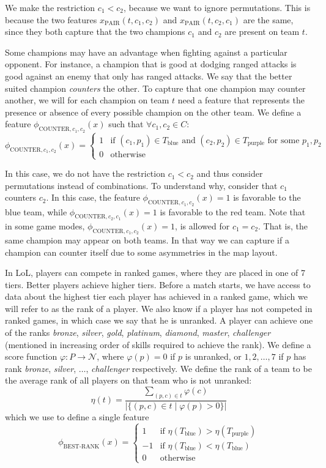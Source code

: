 We make the restriction $c_1 < c_2$, because we want to ignore permutations. This is because the two features $x_\text{PAIR}(t, c_1, c_2)$ and $x_\text{PAIR}(t, c_2, c_1)$ are the same, since they both capture that the two champions $c_1$ and $c_2$ are present on team $t$.

Some champions may have an advantage when fighting against a particular opponent.
For instance, a champion that is good at dodging ranged attacks is good against an enemy that only has ranged attacks.
We say that the better suited champion \emph{counters} the other.
To capture that one champion may counter another, we will for each champion on team $t$ need a feature that represents the presence or absence of every possible champion on the other team.
We define a feature $\phi_{\text{COUNTER},c_1,c_2}(x)$ such that $\forall c_1, c_2 \in C:$
\[\phi_{\text{COUNTER},c_1,c_2}(x) = 
\begin{cases} 
1 & \text{if } (c_1, p_1) \in T_\text{blue} \text{ and } (c_2, p_2) \in T_\text{purple} \text{ for some } p_1, p_2 \\ 
0 & \text{otherwise} 
\end{cases}\]

In this case, we do not have the restriction $c_1 < c_2$ and thus consider permutations instead of combinations.
To understand why, consider that $c_1$ counters $c_2$.
In this case, the feature $\phi_{\text{COUNTER},c_1,c_2}(x) = 1$ is favorable to the blue team, while $\phi_{\text{COUNTER},c_2,c_1}(x) = 1$ is favorable to the red team.
Note that in some game modes, $\phi_{\text{COUNTER},c_1,c_2}(x) = 1$, is allowed for $c_1 = c_2$. That is, the same champion may appear on both teams.
In that way we can capture if a champion can counter itself due to some asymmetries in the map layout.

In LoL, players can compete in ranked games, where they are placed in one of 7 tiers. Better players achieve higher tiers.
Before a match starts, we have access to data about the highest tier each player has achieved in a ranked game, which we will refer to as the rank of a player. We also know if a player has not competed in ranked games, in which case we say that he is unranked.
A player can achieve one of the ranks \textit{bronze}, \textit{silver}, \textit{gold}, \textit{platinum}, \textit{diamond}, \textit{master}, \textit{challenger} (mentioned in increasing order of skills required to achieve the rank).
We define a score function $\varphi : P \rightarrow \mathcal{N}$, where $\varphi(p) = 0$ if $p$ is unranked, or $1, 2, \dots, 7$ if $p$ has rank \textit{bronze}, \textit{silver}, $\dots$, \textit{challenger} respectively.
We define the rank of a team to be the average rank of all players on that team who is not unranked:
\[
\eta(t) = \frac{\sum\limits_{(p, c) \in t} \varphi(c)}{|\{(p, c) \in t \mid \varphi(p) > 0\}|}
\]
which we use to define a single feature
\[
\phi_\text{BEST-RANK}(x) = 
\begin{cases} 
  1 & \text{if } \eta(T_\text{blue}) > \eta(T_\text{purple})\\
  -1 & \text{if } \eta(T_\text{blue}) < \eta(T_\text{blue})\\
  0 & \text{otherwise} 
\end{cases}
\]

